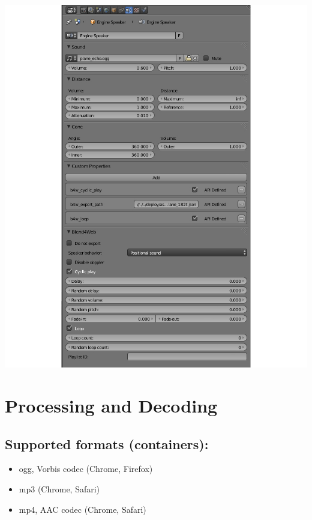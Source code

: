 \documentclass[a4paper,12pt,oneside]{sphinxmanual}
\begin{document}
{\hfill\includegraphics[width=1.000\linewidth]{speaker_settings.jpg}\hfill}

\begin{DUlineblock}{0em}
\item[] 
\end{DUlineblock}


\section{Processing and Decoding}
\label{audio:id3}\label{audio:encoding}

\subsection{Supported formats (containers):}
\label{audio:id4}\begin{itemize}
\item {} 
ogg, Vorbis codec (Chrome, Firefox)

\item {} 
mp3 (Chrome, Safari)

\item {} 
mp4, AAC codec (Chrome, Safari)

\end{itemize}
\end{document}
